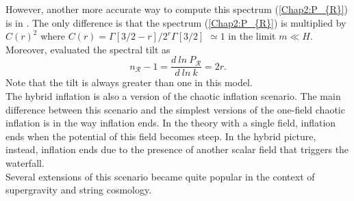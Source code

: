 \documentclass[11pt,a4paper,twoside]{book}
\begin{document}
However, another more accurate way to compute this spectrum (\ref{Chap2:P_{R}}) is in \cite{Chap2:PerturbationsHybridInflation}. The only difference is that the spectrum (\ref{Chap2:P_{R}}) is multiplied by $ C(r)^{2} $ where $ C(r)=\Gamma[3/2-r]/2^{r}\Gamma[3/2] $ $\simeq 1$ in the limit $ m\ll H $.
Moreover, \cite{Chap2:PerturbationsHybridInflation} evaluated the spectral tilt as
\begin{equation}
	n_{\mathcal{R}} - 1 = \frac{d\ ln\ P_{\mathcal{R}}}{d\ ln\ k} = 2r. 
\end{equation}
Note that the tilt is always greater than one in this model.\\
The hybrid inflation is also a version of the chaotic inflation scenario. The main difference between this scenario and the simplest versions of the one-field chaotic inflation is in the way inflation ends. In the theory with  a single field, inflation ends when the potential of this field becomes steep. In the hybrid picture, instead, inflation ends due to the presence of another scalar field that triggers the waterfall.\\
Several extensions of this scenario became quite popular in the context of supergravity and string cosmology.
\end{document}
